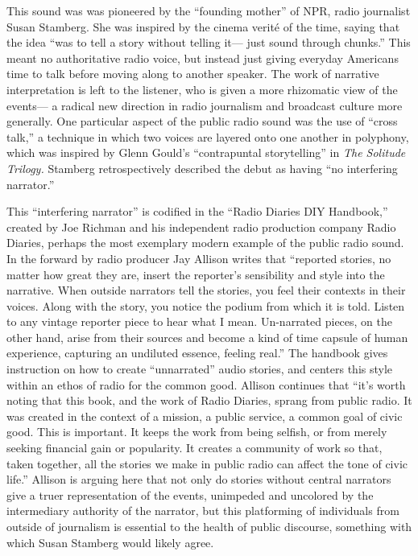 \documentclass[12pt,letterpaper]{article}
\begin{document}
	This sound was was pioneered by the ``founding mother'' of NPR, radio 
	journalist Susan Stamberg. She was inspired by the cinema verité of the
	time, saying that the idea ``was to tell a story without telling it---
	just sound through chunks.'' This meant no authoritative radio voice,
	but instead just giving everyday Americans time to talk before moving 
	along to another speaker. The work of narrative interpretation is left
	to the listener, who is given a more rhizomatic view of the events---
	a radical new direction in radio journalism and broadcast culture more
	generally.  One particular aspect of the public radio sound was the use
	of ``cross
	talk,'' a technique in which two voices are layered onto one another 	
	in polyphony, which was inspired by Glenn Gould's ``contrapuntal 
	storytelling'' in \textit{The Solitude Trilogy.}\autocite[197]{Porter}
	Stamberg retrospectively described the debut as having ``no interfering 
	narrator.''\autocite[185]{Porter}

	This ``interfering narrator'' is codified in the ``Radio Diaries DIY
	Handbook,'' created by Joe Richman and his independent radio production
	company Radio Diaries, perhaps the most exemplary modern example of the 	public radio sound. In the forward by radio producer Jay Allison writes 	that ``reported stories, no matter how great they are, 
	insert the reporter’s sensibility and style into the narrative. When 
	outside narrators tell the stories, you feel their contexts in their 
	voices. Along with the story, you notice the podium from which it is 
	told. Listen to any vintage reporter piece to hear what I mean. 
	Un-narrated pieces, on the other hand, arise from their sources and 
	become a kind of time capsule of human experience, capturing an 
	undiluted essence, feeling real.'' The handbook gives instruction on how
	to create ``unnarrated'' audio stories, and centers this style within
	an ethos of radio for the common good. Allison continues that ``it's 
	worth noting that this book, and the work of 
	Radio Diaries, sprang from public radio. It was created in the context 
	of a mission, a public service, a common goal of civic good. This is 
	important. It keeps the work from being selfish, or from merely seeking
	financial gain or popularity. It creates a community of work so that, 
	taken together, all the stories we make in public radio can affect the 
	tone of civic life.''\autocite{Richman} Allison is arguing here that not only
	do stories without central narrators give a truer representation of the 
	events, unimpeded and uncolored by the intermediary authority of the
	narrator, but this platforming of individuals from outside of journalism
	is essential to the health of public discourse, something with which
	Susan Stamberg would likely agree.  
	
\end{document}
